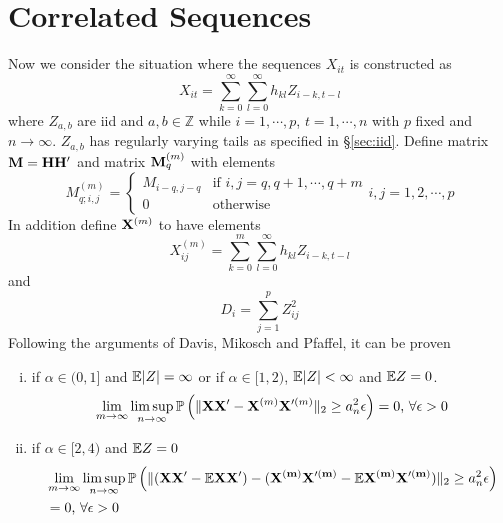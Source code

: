 \documentclass{article}
\begin{document}
\section{Correlated Sequences}
Now we consider the situation where the sequences $X_{it}$ is
constructed as
\[
X_{it} = \sum_{k=0}^{\infty} \sum_{l=0}^{\infty} h_{kl} Z_{i-k, t-l}
\]
where $Z_{a,b}$ are iid and $a,b \in \mathbb{Z}$ while $i=1,\cdots,p$,
$t=1,\cdots,n$ with $p$ fixed and $n \to \infty$. $Z_{a,b}$ has
regularly varying tails as specified in \S\ref{sec:iid}.
Define matrix $\mathbf{M} = \mathbf{H H'}$ and matrix $\mathbf{M}^{(m)}_q$ with
elements
\[
M^{(m)}_{q; i,j} = \left\{
  \begin{array}{ll}
    M_{i-q, j-q} & \text{if } i,j = q, q+1, \cdots, q+m \\
    0 & \text{otherwise}
  \end{array}
\right.
i,j = 1,2,\cdots,p
\]
In addition define $\mathbf{X}^{(m)}$ to have elements
\[
X^{(m)}_{ij} = \sum_{k=0}^{m} \sum_{l=0}^{\infty} h_{kl} Z_{i-k, t-l}
\]
and
\[
D_i = \sum_{j=1}^p Z_{ij}^2
\]
Following the arguments of Davis, Mikosch and
Pfaffel\cite{Mikosch2014}, it can be proven
\begin{enumerate}[i)]
\item if $\alpha \in (0, 1]$ and $\mathbb{E}|Z| = \infty$ or if $\alpha \in
  [1, 2)$, $\mathbb{E}|Z| < \infty$ and $\mathbb{E} Z = 0$.
  \[
  \lim_{m\to \infty} \limsup_{n\to\infty} \mathbb{P}\left(
    \|\mathbf{X X'} - \mathbf{X}^{(m)} \mathbf{X}'^{(m)}\|_2 \geq a_n^2 \epsilon
  \right) = 0 \text{, } \forall \epsilon > 0  
  \]
\item if $\alpha \in [2, 4)$ and $\mathbb{E} Z = 0$
  \begin{align*}
    & \lim_{m\to \infty} \limsup_{n\to\infty} \mathbb{P}\left(
      \|(\mathbf{XX'} - \mathbb{E}\mathbf{XX'}) - (\mathbf{X^{(m)} X'^{(m)}} - \mathbb{E}
      \mathbf{X^{(m)} X'^{(m)}})\|_2 \geq a_n^2 \epsilon \right) \\
    &= 0 \text{, } \forall \epsilon > 0
  \end{align*}
\end{enumerate}
\end{document}
